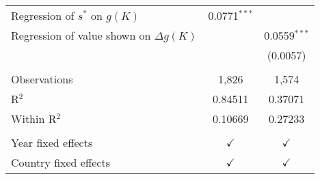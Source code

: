\centering
\begin{tabularx}{\columnwidth}{lcc}
   \midrule 
   Regression of $s^*$ on \(g(K)\)             & 0.0771$^{***}$ &   \\   
   Regression of value shown on $\Delta g(K)$  &                & 0.0559$^{***}$\\   
                                               &                & (0.0057)\\   
    \\
   Observations                                & 1,826          & 1,574\\  
   R$^2$                                       & 0.84511        & 0.37071\\  
   Within R$^2$                                & 0.10669        & 0.27233\\  
    \\
   Year fixed effects                          & $\checkmark$   & $\checkmark$\\   
   Country fixed effects                       & $\checkmark$   & $\checkmark$\\   
   \bottomrule
\end{tabularx}
   \label{tbl-reg_s}
